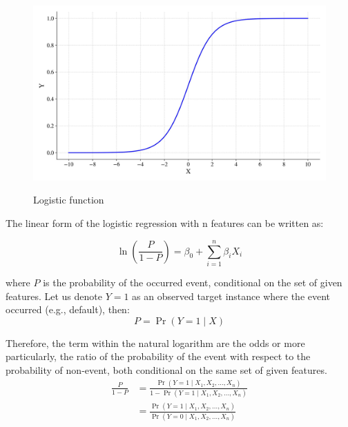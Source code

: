 \begin{figure}[H]
    \centering
    \caption{Logistic function}\vspace{0.5em}
    \label{fig:sigmoid}\
    \includegraphics[width=130mm]{Figures/sigmoid.jpg}
    \vspace{-1em}
\end{figure}

The linear form of the logistic regression with n features can be written as:

\begin{equation}\label{eq}
    \ln\left(\frac{P}{1-P}\right) = \beta_0  + \sum_{i=1}^{n} \beta_i X_i
\end{equation}

where $P$ is the probability of the occurred event, conditional on the set of given features. Let us denote $Y=1$ as an observed target instance where the event occurred (e.g., default), then:
\begin{equation}\label{eq}
    P = \operatorname{Pr}(Y=1 \mid X)
\end{equation}

Therefore, the term within the natural logarithm are the odds or more particularly, the ratio of the probability of the event with respect to the probability of non-event, both conditional on the same set of given features.
\begin{equation}\label{eq}
    \begin{aligned}
    \frac{P}{1-P}  {} & = \frac{\operatorname{Pr}(Y=1 \mid X_1,X_2,\ldots,X_n)}{1-\operatorname{Pr}(Y=1 \mid X_1,X_2,\ldots,X_n)} \\
    & = \frac{\operatorname{Pr}(Y=1 \mid X_1,X_2,\ldots,X_n)}{\operatorname{Pr}(Y=0 \mid X_1,X_2,\ldots,X_n)}
\end{aligned}
    \end{equation}

